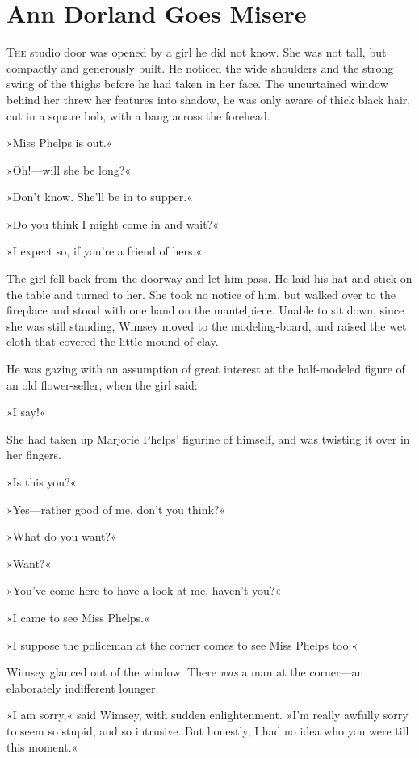 \chapter{Ann Dorland Goes Misere}

\lettrine[lines=4]{T}{he} studio door was opened by a girl he did not know. She was not tall, but compactly and generously built. He noticed the wide shoulders and the strong swing of the thighs before he had taken in her face. The uncurtained window behind her threw her features into shadow, he was only aware of thick black hair, cut in a square bob, with a bang across the forehead.

»Miss Phelps is out.«

»Oh!---will she be long?«

»Don't know. She'll be in to supper.«

»Do you think I might come in and wait?«

»I expect so, if you're a friend of hers.«

The girl fell back from the doorway and let him pass. He laid his hat and stick on the table and turned to her. She took no notice of him, but walked over to the fireplace and stood with one hand on the mantelpiece. Unable to sit down, since she was still standing, Wimsey moved to the modeling-board, and raised the wet cloth that covered the little mound of clay.

He was gazing with an assumption of great interest at the half-modeled figure of an old flower-seller, when the girl said:

»I say!«

She had taken up Marjorie Phelps' figurine of himself, and was twisting it over in her fingers.

»Is this you?«

»Yes\allowbreak---\allowbreak rather good of me, don't you think?«

»What do you want?«

»Want?«

»You've come here to have a look at me, haven't you?«

»I came to see Miss Phelps.«

»I suppose the policeman at the corner comes to see Miss Phelps too.«

Wimsey glanced out of the window. There \textit{was} a man at the corner\allowbreak---\allowbreak an elaborately indifferent lounger.

»I am sorry,« said Wimsey, with sudden enlightenment. »I'm really awfully sorry to seem so stupid, and so intrusive. But honestly, I had no idea who you were till this moment.«

